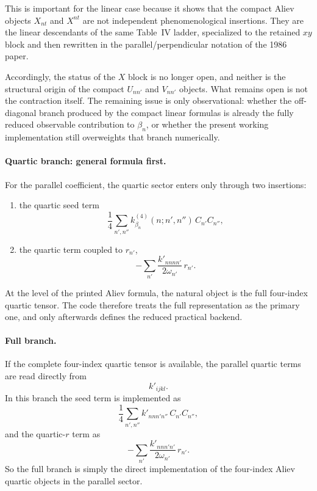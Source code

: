 \documentclass[11pt]{article}
\begin{document}
This is important for the linear case because it shows that the compact
Aliev objects $X_{nt}$ and $X^{nt}$ are not independent phenomenological
insertions. They are the linear descendants of the same Table~IV ladder,
specialized to the retained $xy$ block and then rewritten in the
parallel/perpendicular notation of the 1986 paper.

Accordingly, the status of the $X$ block is no longer open, and neither is the
structural origin of the compact $U_{nn'}$ and $V_{nn'}$ objects. What remains
open is not the contraction itself. The remaining issue is only observational:
whether the off-diagonal branch produced by the compact linear formulas is
already the fully reduced observable contribution to $\beta_n$, or whether the
present working implementation still overweights that branch numerically.

\paragraph{Quartic branch: general formula first.}
For the parallel coefficient, the quartic sector enters only through two
insertions:
\begin{enumerate}
\item the quartic seed term
\[
\frac{1}{4}\sum_{n',n''} k^{(4)}_{\beta_n}(n;n',n'')\,C_{n'}C_{n''},
\]
\item the quartic term coupled to $r_{n'}$,
\[
-\sum_{n'} \frac{k'_{nnnn'}}{2\omega_{n'}}\,r_{n'}.
\]
\end{enumerate}

At the level of the printed Aliev formula, the natural object is the full
four-index quartic tensor. The code therefore treats the full representation as
the primary one, and only afterwards defines the reduced practical backend.

\paragraph{Full branch.}
If the complete four-index quartic tensor is available, the parallel quartic
terms are read directly from
\[
k'_{ijkl}.
\]
In this branch the seed term is implemented as
\[
\frac{1}{4}\sum_{n',n''} k'_{nnn'n''}\,C_{n'}C_{n''},
\]
and the quartic-$r$ term as
\[
-\sum_{n'} \frac{k'_{nnn'n'}}{2\omega_{n'}}\,r_{n'}.
\]
So the full branch is simply the direct implementation of the four-index Aliev
quartic objects in the parallel sector.
\end{document}
